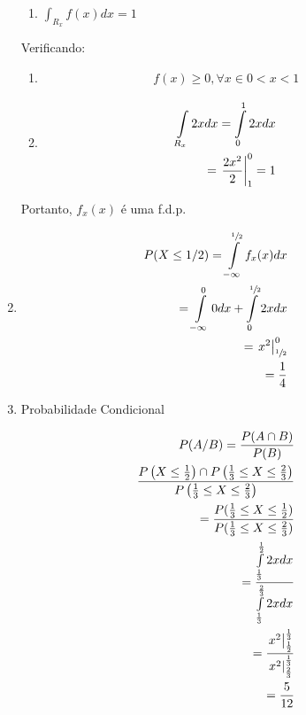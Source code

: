 \begin{description}
\begin{enumerate}[label=(\alph*)]
\begin{enumerate}[leftmargin=*, label=\roman*., widest=IV, align=left]
             \item $\int_{R_{x}} f(x)dx=1$
           \end{enumerate}
           Verificando:         
           \begin{enumerate}[leftmargin=*, label=\roman*., widest=IV, align=left]
             \item 
             \begin{align*}                 f(x)\geq 0, \forall x \in  0<x<1\end{align*}
             \item 
               \begin{align*}
                 \int \limits_{R_x} 2x dx
                 =\int \limits_{0}^1 2x dx\\ 
                 = \left.\frac{2x^2}{2}\right\rvert_{1}^{0}= 1
               \end{align*}

           \end{enumerate}


           Portanto, $f_x(x)$ é uma f.d.p.\

         \item 
           \begin{align*}
             P(X \leq 1/2) = \int \limits_{-\infty}^{\sfrac{1}{2}} f_x (x) dx\\
             = \int \limits_{-\infty}^0 0 dx + \int \limits_{0}^{\sfrac{1}{2}} 2x dx \\
             = \left.x^2\right\rvert_{{\sfrac{1}{2}}}^{0}\\
             =\frac{1}{4} 
           \end{align*}
         \item Probabilidade Condicional
           \begin{figure}[H]
             \centering
             
             \label{fig:26}
           \end{figure}
           \begin{align*}
             P(A/B)= \frac{P(A\cap B)}{P(B)} \\
             \frac{ P\left( X \leq \frac{1}{2} \right)\cap P \left(\frac{1}{3} \leq X \leq \frac{2}{3}\right)}{P \left( \frac{1}{3} \leq X \leq \frac{2}{3}\right)}\\
             = \frac{P( \frac{1}{3} \leq X \leq \frac{1}{2} )}{P( \frac{1}{3} \leq X \leq \frac{2}{3} )}\\
             = \frac{\int \limits_{\frac{1}{3}}^{\frac{1}{2}} 2x dx}{\int \limits_{\frac{1}{3}}^{\frac{2}{3}} 2x dx} \\
             = \frac{\left.x^2\right\rvert_{{\frac{1}{2}}}^{{\frac{1}{3}}}}{ \left.x^2\right\rvert_{{\frac{2}{3}}}^{{\frac{1}{3}}}}\\
             = \frac{5}{12}
           \end{align*}
       \end{enumerate}

   \end{description}
